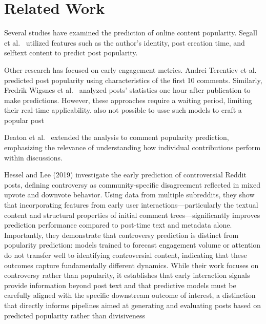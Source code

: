 \chapter{Related Work}

Several studies have examined the prediction of online content popularity. 
Segall et al.~\cite{segall2012predicting} utilized features such as the author's identity, post creation time, and selftext content to predict post popularity. 

Other research has focused on early engagement metrics. 
Andrei Terentiev et al.~\cite{terentiev2014predicting} predicted post popularity using characteristics of the first 10 comments.
Similarly, Fredrik Wigsnes et al.~\cite{wigsnes2019predicting} analyzed posts' statistics one hour after publication to make predictions. 
However, these approaches require a waiting period, limiting their real-time applicability. also not possible to usse such models to craft a popular post

Deaton et al.~\cite{deaton2017using} extended the analysis to comment popularity prediction, emphasizing the relevance of understanding how individual contributions perform within discussions.




Hessel and Lee (2019) investigate the early prediction of controversial Reddit posts, defining controversy as community-specific disagreement reflected in mixed upvote and downvote behavior. 
Using data from multiple subreddits, they show that incorporating features from early user interactions—particularly the textual content and structural properties of initial comment trees—significantly improves prediction performance compared to post-time text and metadata alone. 
Importantly, they demonstrate that controversy prediction is distinct from popularity prediction: models trained to forecast engagement volume or attention do not transfer well to identifying controversial content, indicating that these outcomes capture fundamentally different dynamics. 
While their work focuses on controversy rather than popularity, it establishes that early interaction signals provide information beyond post text and that predictive models must be carefully aligned with the specific downstream outcome of interest, a distinction that directly informs pipelines aimed at generating and evaluating posts based on predicted popularity rather than divisiveness
\cite{hessel2019something}

